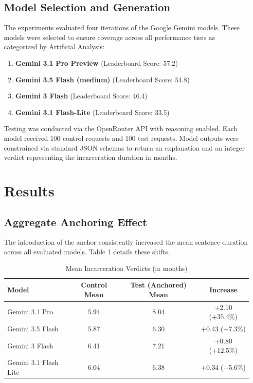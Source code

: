 \documentclass[12pt]{article}
\begin{document}
\subsection{Model Selection and Generation}
The experiments evaluated four iterations of the Google Gemini models. These models were selected to ensure coverage across all performance tiers as categorized by Artificial Analysis:
\begin{enumerate}
    \item \textbf{Gemini 3.1 Pro Preview} (Leaderboard Score: 57.2)
    \item \textbf{Gemini 3.5 Flash (medium)} (Leaderboard Score: 54.8)
    \item \textbf{Gemini 3 Flash} (Leaderboard Score: 46.4)
    \item \textbf{Gemini 3.1 Flash-Lite} (Leaderboard Score: 33.5)
\end{enumerate}
Testing was conducted via the OpenRouter API with reasoning enabled. Each model received 100 control requests and 100 test requests. Model outputs were constrained via standard JSON schemas to return an explanation and an integer verdict representing the incarceration duration in months.

\section{Results}

\subsection{Aggregate Anchoring Effect}
The introduction of the anchor consistently increased the mean sentence duration across all evaluated models. Table 1 details these shifts.

\begin{table}[H]
    \centering
    \caption{Mean Incarceration Verdicts (in months)}
    \label{tab:mean_verdicts}
    \begin{tabular}{lccc}
        \toprule
        \textbf{Model} & \textbf{Control Mean} & \textbf{Test (Anchored) Mean} & \textbf{Increase} \\
        \midrule
        Gemini 3.1 Pro       & 5.94 & 8.04 & +2.10 (+35.4\%) \\
        Gemini 3.5 Flash     & 5.87 & 6.30 & +0.43 (+7.3\%) \\
        Gemini 3 Flash       & 6.41 & 7.21 & +0.80 (+12.5\%) \\
        Gemini 3.1 Flash Lite& 6.04 & 6.38 & +0.34 (+5.6\%) \\
        \bottomrule
    \end{tabular}
\end{table}
\end{document}
